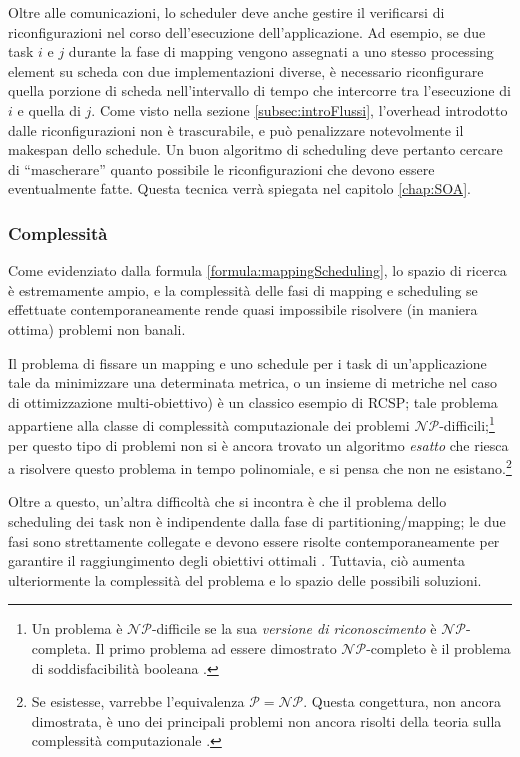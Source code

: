Oltre alle comunicazioni, lo scheduler deve anche gestire il verificarsi di 
riconfigurazioni nel corso dell'esecuzione dell'applicazione. Ad esempio, se due task $i$ 
e $j$ durante la fase di mapping vengono assegnati a uno stesso processing element su 
scheda con due implementazioni diverse, è necessario riconfigurare quella porzione di 
scheda nell'intervallo di tempo che intercorre tra l'esecuzione di $i$ e quella di $j$.
Come visto nella sezione \ref{subsec:introFlussi}, l'overhead introdotto dalle riconfigurazioni
non \`e trascurabile, e pu\`o penalizzare notevolmente il makespan dello schedule.
Un buon algoritmo di scheduling deve pertanto cercare di ``mascherare'' quanto possibile le
riconfigurazioni che devono essere eventualmente fatte. Questa tecnica verr\`a spiegata nel capitolo
\ref{chap:SOA}.

\subsubsection{Complessità}
Come evidenziato dalla formula \eqref{formula:mappingScheduling}, lo spazio di ricerca è 
estremamente ampio, e la complessità delle fasi di mapping e scheduling se effettuate 
contemporaneamente rende quasi impossibile risolvere (in maniera ottima) problemi non 
banali.

Il problema di fissare un mapping e uno schedule per i task di un'applicazione
tale da minimizzare una determinata metrica, o un insieme di metriche nel caso
di ottimizzazione multi-obiettivo) è un classico esempio di \ac{RCSP}; tale
problema appartiene alla classe di complessità computazionale dei problemi
$\mathcal{NP}$-difficili;\footnote{Un problema \`e $\mathcal{NP}$-difficile se la sua \emph{versione
di riconoscimento} \`e $\mathcal{NP}$-completa. Il primo problema ad essere dimostrato
$\mathcal{NP}$-completo \`e il problema di soddisfacibilit\`a booleana \cite{CookSAT}.} per questo tipo di problemi non si è ancora
trovato un algoritmo \emph{esatto} che riesca a risolvere questo problema in
tempo polinomiale, e si pensa che non ne esistano.\footnote{Se esistesse,
varrebbe l'equivalenza $\mathcal{P} = \mathcal{NP}$. Questa congettura, non ancora
dimostrata, \`e uno dei principali problemi non ancora risolti della teoria sulla
complessit\`a computazionale \cite{GasarchPoll}.}

Oltre a questo, un'altra difficoltà che si incontra è che il problema dello
scheduling dei task non è indipendente dalla fase di partitioning/mapping; le
due fasi sono strettamente collegate e devono essere risolte contemporaneamente
per garantire il raggiungimento degli obiettivi ottimali
\cite{AntColonyOptimization}. Tuttavia, ciò aumenta ulteriormente la
complessità del problema e lo spazio delle possibili soluzioni.


